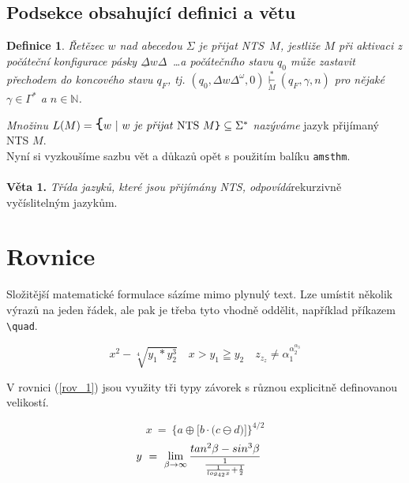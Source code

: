 \documentclass[11pt,twocolumn,a4paper]{article}
\newtheorem{theorem}{Definice}
\begin{document}
\subsection{Podsekce obsahující definici a větu}
\begin{theorem} \normalfont
\label{def_2} Řetězec $w$ nad abecedou $\Sigma$ je přijat NTS~$M$, \textit{jestliže} $M$ \textit{při aktivaci z počáteční konfigurace pásky} ${\underline \Delta}w \Delta$~\dots \textit{a počátečního stavu} $q_0$ \textit{může zastavit přechodem do koncového stavu} $q_F$, \textit{tj.} $(q_0, \Delta w \Delta^\omega, 0) \underset{M}{\overset{*}{\vdash}} (q_F, \gamma, n)$ \textit{pro nějaké} $\gamma \in \Gamma^*$ \textit{a} $n \in \mathbb{N}$.
\end{theorem} \vspace{-0.2cm}

\textit{Množinu} $ L(M) = {\Large\verb|{|}w\  |\  w$ \textit{je přijat} NTS $M\verb|}| \subseteq \Sigma^*$ \textit{nazýváme} jazyk přijímaný NTS $M$. \\

Nyní si vyzkoušíme sazbu vět a důkazů opět s použitím balíku \texttt{amsthm}. \\ \\
\textbf{Věta 1.} \textit{Třída jazyků, které jsou přijímány NTS, odpovídá}\linebreak rekurzivně vyčíslitelným jazykům.


\section{Rovnice}

Složitější matematické formulace sázíme mimo plynulý text. Lze umístit několik výrazů na jeden řádek, ale pak je třeba tyto vhodně oddělit, například příkazem \verb|\quad|.

$$ x^2 - \sqrt[4]{y_1 * y^3_2} \quad x > y_1 \geqq y_2 \quad z_{z_{z}} \neq \alpha_1^{\alpha_2^{\alpha_3}}$$

V rovnici (\ref{rov_1}) jsou využity tři typy závorek s různou explicitně definovanou velikostí.

\begin{equation}
\label{rov_1}x \  = \  \bigg\{a \oplus \Big[b \cdot \big(c \ominus d\big) \Big]\bigg\}^{4/2} 
\end{equation}
\begin{equation}
\label{rov_2} \hspace{-0.4cm}y \  = \  \lim_{\beta \rightarrow \infty} \frac{tan^2 \beta - sin^3\beta}{\frac{1}{\frac{1}{log_{42} x} + \frac{1}{2}}}
\end{equation}
\end{document}
